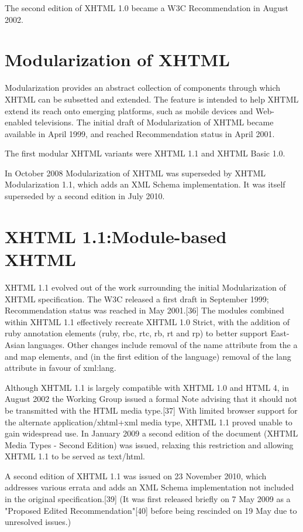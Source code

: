 The second edition of XHTML 1.0 became a W3C Recommendation in August 2002.




\section{Modularization of XHTML}

Modularization provides an abstract collection of components through which XHTML can be subsetted and extended. The feature is intended to help XHTML extend its reach onto emerging platforms, such as mobile devices and Web-enabled televisions. The initial draft of Modularization of XHTML became available in April 1999, and reached Recommendation status in April 2001.

The first modular XHTML variants were XHTML 1.1 and XHTML Basic 1.0.

In October 2008 Modularization of XHTML was superseded by XHTML Modularization 1.1, which adds an XML Schema implementation. It was itself superseded by a second edition in July 2010.




\section{XHTML 1.1:Module-based XHTML}


XHTML 1.1 evolved out of the work surrounding the initial Modularization of XHTML specification. The W3C released a first draft in September 1999; Recommendation status was reached in May 2001.[36] The modules combined within XHTML 1.1 effectively recreate XHTML 1.0 Strict, with the addition of ruby annotation elements (ruby, rbc, rtc, rb, rt and rp) to better support East-Asian languages. Other changes include removal of the name attribute from the a and map elements, and (in the first edition of the language) removal of the lang attribute in favour of xml:lang.

Although XHTML 1.1 is largely compatible with XHTML 1.0 and HTML 4, in August 2002 the Working Group issued a formal Note advising that it should not be transmitted with the HTML media type.[37] With limited browser support for the alternate application/xhtml+xml media type, XHTML 1.1 proved unable to gain widespread use. In January 2009 a second edition of the document (XHTML Media Types - Second Edition) was issued, relaxing this restriction and allowing XHTML 1.1 to be served as text/html.

A second edition of XHTML 1.1 was issued on 23 November 2010, which addresses various errata and adds an XML Schema implementation not included in the original specification.[39] (It was first released briefly on 7 May 2009 as a "Proposed Edited Recommendation"[40] before being rescinded on 19 May due to unresolved issues.)


